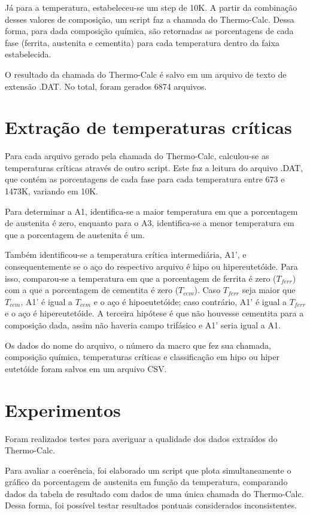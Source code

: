\documentclass[brazil,tese,epusp]{usp}
\begin{document}
Já para a temperatura, estabeleceu-se um step de 10K. A partir da combinação desses valores de composição, um script faz a chamada do Thermo-Calc\textregistered{}. Dessa forma, para dada composição química, são retornadas as porcentagens de cada fase (ferrita, austenita e cementita) para cada temperatura dentro da faixa estabelecida.

O resultado da chamada do Thermo-Calc\textregistered{} é salvo em um arquivo de texto de extensão .DAT. No total, foram gerados 6874 arquivos.

\section{Extra\c{c}\~ao de temperaturas cr\'iticas}

Para cada arquivo gerado pela chamada do Thermo-Calc\textregistered{}, calculou-se as temperaturas críticas através de outro script. Este faz a leitura do arquivo .DAT, que contém as porcentagens de cada fase para cada temperatura entre 673 e 1473K, variando em 10K.

Para determinar a A1, identifica-se a maior temperatura em que a porcentagem de austenita é zero, enquanto para o A3, identifica-se a menor temperatura em que a porcentagem de austenita é um.

Também identificou-se a temperatura crítica intermediária, A1', e consequentemente se o aço do respectivo arquivo é hipo ou hipereutetóide. Para isso, comparou-se a temperatura em que a porcentagem de ferrita é zero ($T_{ferr}$) com a que a porcentagem de cementita é zero ($T_{cem}$). Caso $T_{ferr}$ seja maior que $T_{cem}$, A1' é igual a $T_{cem}$ e o aço é hipoeutetóide; caso contrário, A1' é igual a $T_{ferr}$ e o aço é hipereutetóide. A terceira hipótese é que não houvesse cementita para a composição dada, assim não haveria campo trifásico e A1' seria igual a A1.

Os dados do nome do arquivo, o número da macro que fez sua chamada, composição química, temperaturas críticas e classificação em hipo ou hiper eutetóide foram salvos em um arquivo CSV.

\section{Experimentos}

Foram realizados testes para averiguar a qualidade dos dados extraídos do Thermo-Calc\textregistered{}.

Para avaliar a coerência, foi elaborado um script que plota simultaneamente o gráfico da porcentagem de austenita em função da temperatura, comparando dados da tabela de resultado com dados de uma única chamada do Thermo-Calc\textregistered{}. Dessa forma, foi possível testar resultados pontuais considerados inconsistentes.
\end{document}
